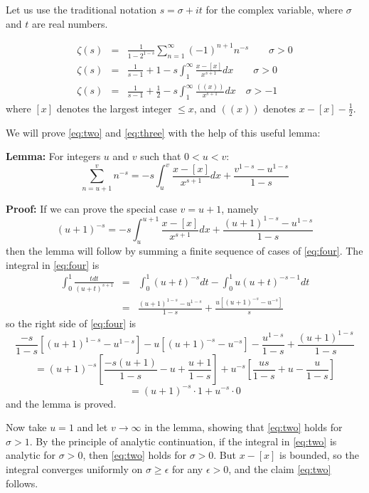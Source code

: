 \documentclass[12pt]{article}
\begin{document}
Let us use the traditional notation $s=\sigma+it$ for the complex variable,
where $\sigma$ and $t$ are real numbers.

\begin{eqnarray}
\zeta(s)&=&
\frac{1}{1-2^{1-s}}\sum_{n=1}^\infty (-1)^{n+1}n^{-s}
\qquad\sigma>0
\label{eq:one}
\\
\zeta(s)&=&
\frac{1}{s-1}+1-s\int_1^\infty \frac{x-[x]}{x^{s+1}}dx
\qquad\sigma>0
\label{eq:two}
\\
\zeta(s)&=&
\frac{1}{s-1}+\frac{1}{2}-s\int_1^\infty \frac{((x))}{x^{s+1}}dx
\quad\sigma>-1
\label{eq:three}
\end{eqnarray}
where $[x]$ denotes the largest integer $\le x$,
and $((x))$ denotes $x-[x]-\frac{1}{2}$.

We will prove \eqref{eq:two} and \eqref{eq:three} with the help of this
useful lemma:

\textbf{Lemma:} For integers $u$ and $v$ such that $0<u<v$:
\begin{equation*}
\sum_{n=u+1}^v n^{-s} =
  -s\int_u^v \frac{x-[x]}{x^{s+1}}dx
  +\frac{v^{1-s}-u^{1-s}}{1-s}
\end{equation*}

\textbf{Proof:} If we can prove the special case $v=u+1$, namely
\begin{equation}
(u+1)^{-s} = -s\int_u^{u+1} \frac{x-[x]}{x^{s+1}}dx
+\frac{(u+1)^{1-s}-u^{1-s}}{1-s}
\label{eq:four}
\end{equation}
then the lemma will follow by summing a finite sequence of cases of
\eqref{eq:four}.
The integral in \eqref{eq:four} is
\begin{eqnarray*}
\int_0^1 \frac{tdt}{(u+t)^{s+1}}
     &=& \int_0^1 (u+t)^{-s}dt - \int_0^1 u(u+t)^{-s-1}dt \\
     &=& \frac{(u+1)^{1-s}-u^{1-s}}{1-s}
         +\frac{u\left[(u+1)^{-s}-u^{-s}\right]}{s}
\end{eqnarray*}
so the right side of \eqref{eq:four} is
$$\frac{-s}{1-s}\left[(u+1)^{1-s}-u^{1-s}\right]
         -u\left[(u+1)^{-s}-u^{-s}\right]
         -\frac{u^{1-s}}{1-s} +\frac{(u+1)^{1-s}}{1-s}
$$
$$=(u+1)^{-s}\left[\frac{-s(u+1)}{1-s}-u+\frac{u+1}{1-s}\right]
+u^{-s}\left[\frac{us}{1-s}+u-\frac{u}{1-s}\right]
$$
$$=(u+1)^{-s}\cdot 1+u^{-s}\cdot 0
$$
and the lemma is proved.

Now take $u=1$ and let $v\to \infty$ in the lemma, showing that
\eqref{eq:two} holds for $\sigma>1$.
By the principle of analytic continuation, if
the integral in \eqref{eq:two} is analytic for $\sigma>0$,
then \eqref{eq:two} holds for $\sigma>0$.
But $x-[x]$ is bounded, so the integral converges
uniformly on $\sigma\ge\epsilon$ for any $\epsilon>0$, and the claim
\eqref{eq:two} follows.
\end{document}
